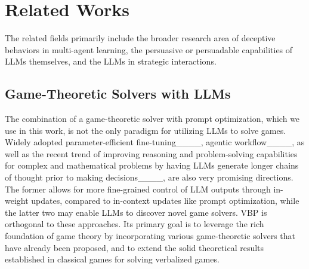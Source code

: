 \section{Related Works}
\label{sec:related}

The related fields primarily include the broader research area of deceptive behaviors in multi-agent learning, the persuasive or persuadable capabilities of LLMs themselves, and the LLMs in strategic interactions. 

\subsection{Game-Theoretic Solvers with LLMs}
The combination of a game-theoretic solver with prompt optimization, which we use in this work, is not the only paradigm for utilizing LLMs to solve games. 
Widely adopted parameter-efficient fine-tuning____, agentic workflow____, as well as the recent trend of improving reasoning and problem-solving capabilities for complex and mathematical problems by having LLMs generate longer chains of thought prior to making decisions____, are also very promising directions. 
The former allows for more fine-grained control of LLM outputs through in-weight updates, compared to in-context updates like prompt optimization, while the latter two may enable LLMs to discover novel game solvers.
VBP is orthogonal to these approaches.
Its primary goal is to leverage the rich foundation of game theory by incorporating various game-theoretic solvers that have already been proposed, and to extend the solid theoretical results established in classical games for solving verbalized games.





